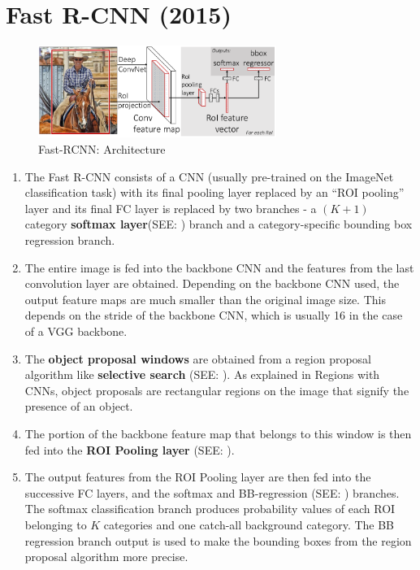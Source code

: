 \section{Fast R-CNN (2015) \cite{arxiv/1504.08083-fast-rcnn,medium/towardsdatascience.com/fast-r-cnn-for-object-detection-a-technical-summary-a0ff94faa022}}\label{Fast R-CNN}

\begin{figure}[h]
    \centering
    \includegraphics[width=\linewidth, height=3cm, keepaspectratio]{Pictures/convolutional-neural-network/fast-rcnn-arch.png}
    \caption*{Fast-RCNN: Architecture \cite{arxiv/1504.08083-fast-rcnn}}
\end{figure}

\begin{enumerate}
    \item The Fast R-CNN consists of a CNN (usually pre-trained on the ImageNet classification task) with its final pooling layer replaced by an “ROI pooling” layer and its final FC layer is replaced by two branches - a $(K + 1)$ category \textbf{softmax layer}(SEE: ) branch and a category-specific bounding box regression branch.

    \item The entire image is fed into the backbone CNN and the features from the last convolution layer are obtained. Depending on the backbone CNN used, the output feature maps are much smaller than the original image size. This depends on the stride of the backbone CNN, which is usually 16 in the case of a VGG backbone.

    \item The \textbf{object proposal windows} are obtained from a region proposal algorithm like \textbf{selective search} (SEE: ). As explained in Regions with CNNs, object proposals are rectangular regions on the image that signify the presence of an object.

    \item The portion of the backbone feature map that belongs to this window is then fed into the \textbf{ROI Pooling layer} (SEE: ).

    \item The output features from the ROI Pooling layer are then fed into the successive FC layers, and the softmax and BB-regression (SEE: ) branches. The softmax classification branch produces probability values of each ROI belonging to $K$ categories and one catch-all background category. The BB regression branch output is used to make the bounding boxes from the region proposal algorithm more precise.
\end{enumerate}

